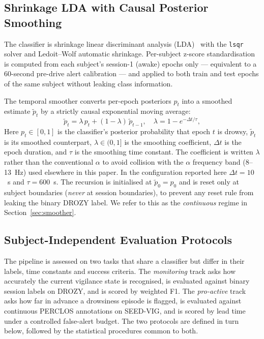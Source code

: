 \documentclass[journal]{IEEEtran}
\DeclareRobustCommand{\add}[1]{#1}                         %
\DeclareRobustCommand{\del}[1]{}                           %
\DeclareRobustCommand{\add}[1]{\hl{#1}}
\DeclareRobustCommand{\del}[1]{{\color{delred}\sout{#1}}\,}
\DeclareRobustCommand{\del}[1]{}                         %
\DeclareRobustCommand{\chg}[2]{\del{#1}\add{#2}}
\begin{document}
\subsection{\chg{Classifier and Smoother}{Shrinkage LDA with Causal Posterior Smoothing}}
The classifier is shrinkage linear discriminant analysis (LDA)~\cite{ledoit2004shrinkage} with the \texttt{lsqr} solver and Ledoit--Wolf automatic shrinkage. Per-subject z-score standardisation is computed from each subject's session-1 (awake) epochs only --- equivalent to a 60-second pre-drive alert calibration --- and applied to both train and test epochs of the same subject without leaking class information.

The temporal smoother converts per-epoch posteriors \(p_t\) into a smoothed estimate \(\tilde{p}_t\) by a strictly causal exponential moving average:
\begin{equation}
    \tilde{p}_t = \lambda \, p_t + (1-\lambda)\,\tilde{p}_{t-1}, \quad \lambda = 1 - e^{-\Delta t/\tau},
    \label{eq:ema}
\end{equation}
\add{Here \mbox{\(p_t \in [0,1]\)} is the classifier's posterior probability that epoch \mbox{\(t\)} is drowsy, \mbox{\(\tilde{p}_t\)} is its smoothed counterpart, \mbox{\(\lambda \in (0,1]\)} is the smoothing coefficient, \mbox{\(\Delta t\)} is the epoch duration, and \mbox{\(\tau\)} is the smoothing time constant. The coefficient is written \mbox{\(\lambda\)} rather than the conventional \mbox{\(\alpha\)} to avoid collision with the \mbox{\(\alpha\)} frequency band (8--13~Hz) used elsewhere in this paper.} In the configuration reported here \(\Delta t = 10\)~s and \(\tau = 600\)~s. The recursion is initialised at \(\tilde{p}_0 = p_0\) and is reset only at subject boundaries (\emph{never} at session boundaries), to prevent any reset rule from leaking the binary DROZY label. We refer to this as the \emph{continuous} regime in Section~\ref{sec:smoother}.

\subsection{\chg{Evaluation Protocols}{Subject-Independent Evaluation Protocols}}
\add{The pipeline is assessed on two tasks that share a classifier but differ in their labels, time constants and success criteria. The \emph{monitoring} track asks how accurately the current vigilance state is recognised, is evaluated against binary session labels on DROZY, and is scored by weighted F1. The \emph{pro-active} track asks how far in advance a drowsiness episode is flagged, is evaluated against continuous PERCLOS annotations on SEED-VIG, and is scored by lead time under a controlled false-alert budget. The two protocols are defined in turn below, followed by the statistical procedures common to both.}
\end{document}
